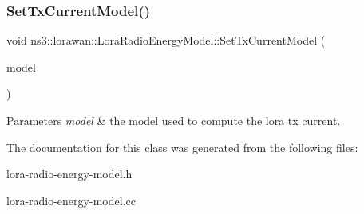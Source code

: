 \subsubsection{\texorpdfstring{Set\+Tx\+Current\+Model()}{SetTxCurrentModel()}}
{\footnotesize\ttfamily void ns3\+::lorawan\+::\+Lora\+Radio\+Energy\+Model\+::\+Set\+Tx\+Current\+Model (\begin{DoxyParamCaption}\item[{Ptr$<$ \hyperlink{classns3_1_1lorawan_1_1LoraTxCurrentModel}{Lora\+Tx\+Current\+Model} $>$}]{model }\end{DoxyParamCaption})}


\begin{DoxyParams}{Parameters}
{\em model} & the model used to compute the lora tx current. \\
\hline
\end{DoxyParams}


The documentation for this class was generated from the following files\+:\begin{DoxyCompactItemize}
\item 
lora-\/radio-\/energy-\/model.\+h\item 
lora-\/radio-\/energy-\/model.\+cc\end{DoxyCompactItemize}

